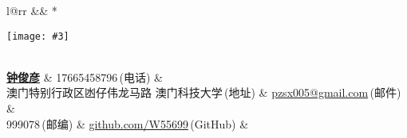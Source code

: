\newcommand{\paint}[3]{
    \begin{minipage}{#1}
        \texttt{[image: \#3]}
    \end{minipage}
}
\newcommand{\myheader}{
\begin{tabular*}{\textwidth}{l@{\extracolsep{\fill}}rr}
  && \multirow{4}*{\paint{2.6cm}{3.2cm}{./image.jpg}}\\
  \specialrule{0em}{4pt}{4pt}
  \textbf{\href{http://herechen.github.io}{\LARGE 钟俊彦}} & 17665458796$\,${\color{labelgrey}(电话)} &\\
 澳门特别行政区凼仔伟龙马路 澳门科技大学$\,${\color{labelgrey}(地址)} & \href{mailto:pzsx005@gmail.com}{pzsx005@gmail.com}$\,${\color{labelgrey}(邮件)} & \\
  999078$\,${\color{labelgrey}(邮编)} & \href{https://github.com/W55699}{github.com/W55699}$\,${\color{labelgrey}(GitHub)} & \\
  \end{tabular*}\\\vspace{0.1in}
}

\myheader

